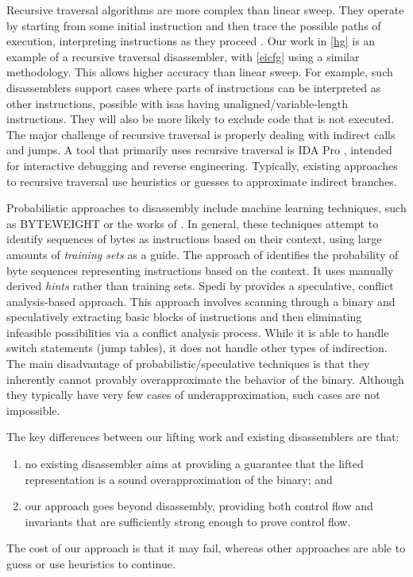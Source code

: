 Recursive traversal algorithms are more complex than linear sweep.
They operate by starting from some initial instruction and then trace the possible paths of execution, interpreting instructions as they proceed \autocite{schwartz2002disassembly,kruegel2004static}.
Our work in \cref{hg} is an example of a recursive traversal disassembler, with \cref{eicfg} using a similar methodology.
This allows higher accuracy than linear sweep.
For example, such disassemblers support cases where parts of instructions can be interpreted as other instructions, possible with \acp{isa} having unaligned/variable-length instructions.
They will also be more likely to exclude code that is not executed.
The major challenge of recursive traversal is properly dealing with indirect calls and jumps.
A tool that primarily uses recursive traversal is IDA Pro \autocite{ida}, intended for interactive debugging and reverse engineering.
Typically, existing approaches to recursive traversal use heuristics or guesses to approximate indirect branches.

Probabilistic approaches to disassembly \autocite{khadra2016speculative,miller2019probabilistic} include machine learning techniques, such as BYTEWEIGHT \autocite{bao2014byteweight} or the works of \textcite{wartell2011differentiating,wartell2014shingled}.
In general, these techniques attempt to identify sequences of bytes as instructions based on their context, using large amounts of \emph{training sets} as a guide.
The approach of \textcite{miller2019probabilistic} identifies the probability of byte sequences representing instructions based on the context.
It uses manually derived \emph{hints} rather than training sets.
Spedi by \textcite{khadra2016speculative} provides a speculative, conflict analysis-based approach.
This approach involves scanning through a binary and speculatively extracting basic blocks of instructions and then eliminating infeasible possibilities via a conflict analysis process.
While it is able to handle switch statements (jump tables), it does not handle other types of indirection.
The main disadvantage of probabilistic/speculative techniques is that they inherently cannot provably overapproximate the behavior of the binary.
Although they typically have very few cases of underapproximation, such cases are not impossible.

The key differences between our lifting work and existing disassemblers are that:
\begin{enumerate}
  \item no existing disassembler aims at providing a guarantee that the lifted representation is a sound overapproximation of the binary; and
  \item our approach goes beyond disassembly, providing both control flow and invariants that are sufficiently strong enough to prove control flow.
\end{enumerate}
The cost of our approach is that it may fail, whereas other approaches are able to guess or use heuristics to continue.

